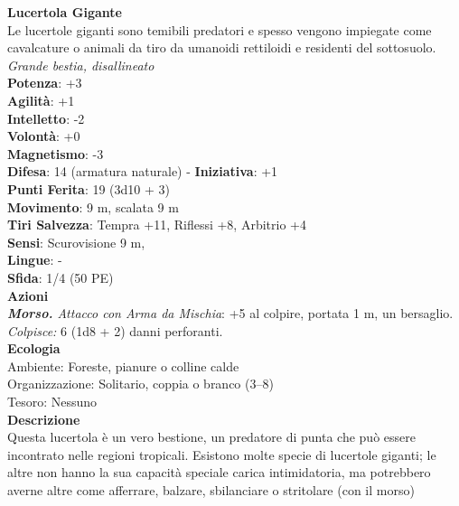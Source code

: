 \begin{multicols}{2}
\medskip\textbf{Lucertola Gigante}\\
Le lucertole giganti sono temibili predatori e spesso vengono impiegate come cavalcature o animali da tiro da umanoidi rettiloidi e residenti del sottosuolo.\\
\emph{Grande bestia, disallineato} \\
\textbf{Potenza}: +3\\
\textbf{Agilità}: +1\\
\textbf{Intelletto}: -2\\
\textbf{Volontà}: +0\\
\textbf{Magnetismo}: -3\\
\textbf{Difesa}: 14 (armatura naturale) - \textbf{Iniziativa}: +1\\
\textbf{Punti Ferita}: 19 (3d10 + 3)\\
\textbf{Movimento}: 9 m, scalata 9 m\\
\textbf{Tiri Salvezza}: Tempra +11, Riflessi +8, Arbitrio +4 \\
\textbf{Sensi}: Scurovisione 9 m, \\
\textbf{Lingue}: -\\
\textbf{Sfida}: 1/4 (50 PE)\smallskip\\
\smallskip\textbf{Azioni}\\
\emph{\textbf{Morso.} Attacco con Arma da Mischia}: +5 al colpire, portata 1 m, un bersaglio.\\
\emph{Colpisce:} 6 (1d8 + 2) danni perforanti.\\
\textbf{Ecologia}\\
Ambiente: Foreste, pianure o colline calde\\
Organizzazione: Solitario, coppia o branco (3–8)\\
Tesoro: Nessuno\\
\textbf{Descrizione}\\

Questa lucertola è un vero bestione, un predatore di punta che può essere incontrato nelle regioni tropicali. Esistono molte specie di lucertole giganti; le altre non hanno la sua capacità speciale carica intimidatoria, ma potrebbero averne altre come afferrare, balzare, sbilanciare o stritolare (con il morso)\\


\end{multicols}
